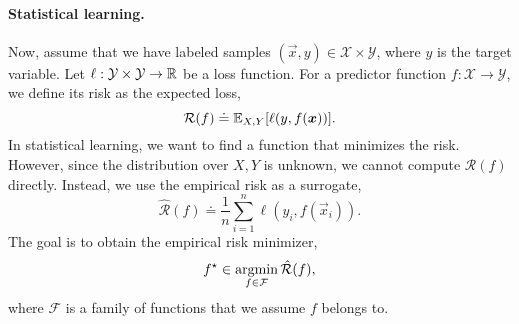 \paragraph{Statistical learning.}

Now, assume that we have labeled samples $(\vec{x}, y) \in \mathcal{X} \times \mathcal{Y}$, where
$y$ is the target variable. Let $\ell: \mathcal{Y} \times \mathcal{Y} \to \mathbb{R}$ be a loss function.
For a predictor function $f: \mathcal{X} \to \mathcal{Y}$, we define its risk as the expected loss, \[
    \mathcal{R}(f) \doteq \mathbb{E}_{X, Y} [\ell(y, f(\bm{x}))].
\]
In statistical learning, we want to find a function that minimizes the risk. However, since the
distribution over $X,Y$ is unknown, we cannot compute $\mathcal{R}(f)$ directly. Instead, we use
the empirical risk as a surrogate, \[
    \hat{\mathcal{R}}(f) \doteq \frac{1}{n} \sum_{i=1}^{n} \ell(y_i, f(\vec{x}_i)).
\]
The goal is to obtain the empirical risk minimizer, \[
    f^\star \in \operatorname*{argmin}_{f \in \mathcal{F}} \hat{\mathcal{R}}(f),
\]
where $\mathcal{F}$ is a family of functions that we assume $f$ belongs to.
